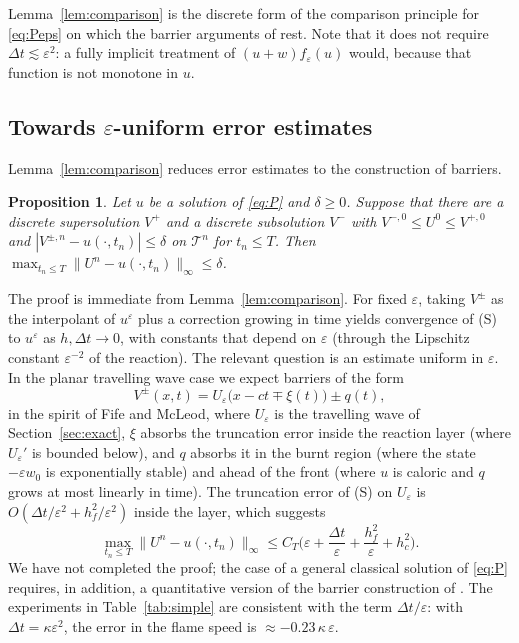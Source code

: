 \documentclass[11pt]{amsart}
\newtheorem{proposition}[theorem]{Proposition}
\theoremstyle{remark}
\newcommand{\ve}{\varepsilon}
\begin{document}
Lemma~\ref{lem:comparison} is the discrete form of the comparison principle
for \eqref{eq:Peps} on which the barrier arguments of
\cite{LedermanVazquezWolanski2001,Petrosyan2002,FernandezBonderWolanski2004}
rest. Note that it does not require $\Delta t\lesssim\ve^2$: a fully implicit
treatment of $(u+w)f_\ve(u)$ would, because that function is not monotone
in $u$.

\subsection{Towards $\ve$-uniform error estimates}
Lemma~\ref{lem:comparison} reduces error estimates to the construction of
barriers.

\begin{proposition}\label{prop:barriers}
Let $u$ be a solution of \eqref{eq:P} and $\delta\ge0$. Suppose that there
are a discrete supersolution $V^+$ and a discrete subsolution $V^-$ with
$V^{-,0}\le U^0\le V^{+,0}$ and $|V^{\pm,n}-u(\cdot,t_n)|\le\delta$ on
$\mathcal T^n$ for $t_n\le T$. Then $\max_{t_n\le T}\|U^n-u(\cdot,t_n)\|_\infty\le\delta$.
\end{proposition}

The proof is immediate from Lemma~\ref{lem:comparison}. For fixed $\ve$, taking
$V^\pm$ as the interpolant of $u^\ve$ plus a correction growing in time
yields convergence of (S) to $u^\ve$ as $h,\Delta t\to0$, with constants that
depend on $\ve$ (through the Lipschitz constant $\ve^{-2}$ of the reaction).
The relevant question is an estimate uniform in $\ve$. In the planar
travelling wave case we expect barriers of the form
\[
V^\pm(x,t)=U_\ve\big(x-ct\mp\xi(t)\big)\pm q(t),
\]
in the spirit of Fife and McLeod, where $U_\ve$ is the travelling wave of
Section~\ref{sec:exact}, $\xi$ absorbs the truncation error inside the
reaction layer (where $U_\ve'$ is bounded below), and $q$ absorbs it in the
burnt region (where the state $-\ve w_0$ is exponentially stable) and ahead
of the front (where $u$ is caloric and $q$ grows at most linearly in time).
The truncation error of (S) on $U_\ve$ is
$O(\Delta t/\ve^2+h_f^2/\ve^2)$ inside the layer, which suggests
\begin{equation}\label{eq:conj}
\max_{t_n\le T}\|U^n-u(\cdot,t_n)\|_\infty\le C_T\Big(\ve+\frac{\Delta t}{\ve}+\frac{h_f^2}{\ve}+h_c^2\Big).
\end{equation}
We have not completed the proof; the case of a general classical solution of
\eqref{eq:P} requires, in addition, a quantitative version of the barrier
construction of \cite[Theorem~4.1]{FernandezBonderWolanski2004}. The
experiments in Table~\ref{tab:simple} are consistent with the term
$\Delta t/\ve$: with $\Delta t=\kappa\ve^2$, the error in the flame speed is
$\approx-0.23\,\kappa\,\ve$.
\end{document}
